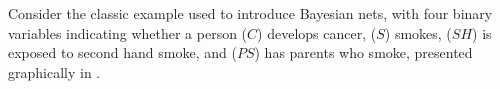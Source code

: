 \documentclass{article}
\numberwithin{equation}{section}
\begin{document}
\begin{notfocus}
	
	

	\begin{example}\label{ex:smoking}
		Consider the classic example used to introduce Bayesian nets, with four binary variables indicating whether a person ($C$) develops cancer, ($S$) smokes, ($SH$) is exposed to second hand smoke, and ($PS$) has parents who smoke, presented graphically in .
		\begin{figure*}[ht!]
			\centering
			

\end{figure*}
\end{example}
\end{notfocus}
\end{document}
